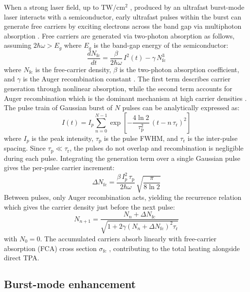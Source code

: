 \documentclass{optica-article}
\begin{document}
When a strong laser field, up to $\text{TW}/\text{cm}^{2}$ \cite{keller2003recent-2a2}, produced by an ultrafast burst-mode laser interacts with a semiconductor, early ultrafast pulses within the burst can generate free carriers by exciting electrons across the band gap via multiphoton absorption \cite{schroder1978}. Free carriers are generated via two-photon absorption as follows, assuming $2\hbar\omega>E_g$ where $E_g$ is the band-gap energy of the semiconductor:
\begin{equation}
\frac{dN_\text{fc}}{dt} = \frac{\beta}{2\hbar\omega}\,I^2(t) - \gamma\,N_\text{fc}^3
\label{eq:n_fc}
\end{equation}
where $N_\text{fc}$ is the free-carrier density, $\beta$ is the two-photon absorption coefficient, and $\gamma$ is the Auger recombination constant \cite{othonos1998,driel1986}. The first term describes carrier generation through nonlinear absorption, while the second term accounts for Auger recombination which is the dominant mechanism at high carrier densities \cite{driel1986}. The pulse train of Gaussian burst of $N$ pulses can be analytically expressed as:
\begin{equation}
I(t) = I_p \sum_{n=0}^{N-1} \exp\!\left[-\frac{4\ln 2}{\tau_\text{p}^2}\,(t - n\,\tau_\text{r})^2\right]
\label{eq:pulse_train}
\end{equation}
where $I_p$ is the peak intensity, $\tau_\text{p}$ is the pulse FWHM, and $\tau_\text{r}$ is the inter-pulse spacing. Since $\tau_\text{p} \ll \tau_\text{r}$, the pulses do not overlap and recombination is negligible during each pulse. Integrating the generation term over a single Gaussian pulse gives the per-pulse carrier increment:
\begin{equation}
\Delta N_\text{fc} = \frac{\beta\,I_p^2\,\tau_\text{p}}{2\hbar\omega}\,\sqrt{\frac{\pi}{8\ln 2}}
\label{eq:deltaN}
\end{equation}
Between pulses, only Auger recombination acts, yielding the recurrence relation which gives the carrier density just before the next pulse:
\begin{equation}
N_{n+1} = \frac{N_n + \Delta N_\text{fc}}{\sqrt{1 + 2\gamma\left(N_n + \Delta N_\text{fc}\right)^2 \tau_\text{r}}}
\label{eq:recurrence}
\end{equation}
with $N_0 = 0$. The accumulated carriers absorb linearly with free-carrier absorption (FCA) cross section $\sigma_\text{fc}$ \cite{boggess1986}, contributing to the total heating alongside direct TPA.

\subsection{Burst-mode enhancement}
\end{document}
